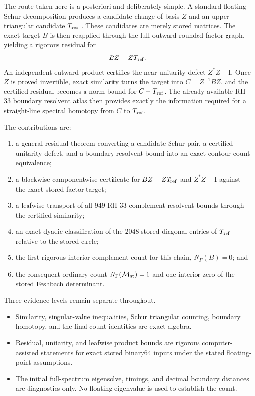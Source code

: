 \documentclass[11pt]{article}
\theoremstyle{definition}
\theoremstyle{remark}
\newcommand{\Id}{\mathrm I}
\newcommand{\Maug}{\mathcal M_{\rm st}}
\newcommand{\Tref}{T_{\rm ref}}
\begin{document}
The route taken here is a posteriori and deliberately simple.  A standard
floating Schur decomposition produces a candidate change of basis \(Z\)
and an upper-triangular candidate \(\Tref\)
\citep{GolubVanLoan2013}.  These candidates are merely stored matrices.
The exact target \(B\) is then reapplied through the full outward-rounded
factor graph, yielding a rigorous residual for
\[
 BZ-Z\Tref.
\]
An independent outward product certifies the near-unitarity defect
\(Z^*Z-\Id\).  Once \(Z\) is proved invertible, exact similarity turns the
target into \(C=Z^{-1}BZ\), and the certified residual becomes a norm bound
for \(C-\Tref\).  The already available RH-33 boundary resolvent atlas then
provides exactly the information required for a straight-line spectral
homotopy from \(C\) to \(\Tref\).

The contributions are:

\begin{enumerate}
 \item a general residual theorem converting a candidate Schur pair,
       a certified unitarity defect, and a boundary resolvent bound into an
       exact contour-count equivalence;
 \item a blockwise componentwise certificate for
       \(BZ-Z\Tref\) and \(Z^*Z-\Id\) against the exact stored-factor target;
 \item a leafwise transport of all \(949\) RH-33 complement resolvent bounds
       through the certified similarity;
 \item an exact dyadic classification of the \(2048\) stored diagonal
       entries of \(\Tref\) relative to the stored circle;
 \item the first rigorous interior complement count for this chain,
       \(N_\Gamma(B)=0\); and
 \item the consequent ordinary count
       \(N_\Gamma(\Maug)=1\) and one interior zero of the stored Feshbach
       determinant.
\end{enumerate}

Three evidence levels remain separate throughout.

\begin{itemize}
 \item Similarity, singular-value inequalities, Schur triangular counting,
       boundary homotopy, and the final count identities are exact algebra.
 \item Residual, unitarity, and leafwise product bounds are rigorous
       computer-assisted statements for exact stored binary64 inputs under
       the stated floating-point assumptions.
 \item The initial full-spectrum eigensolve, timings, and decimal boundary
       distances are diagnostics only.  No floating eigenvalue is used to
       establish the count.
\end{itemize}
\end{document}
